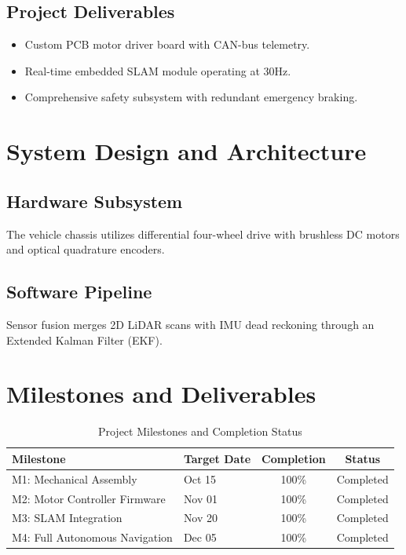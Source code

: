 \documentclass[12pt,a4paper]{report}
\begin{document}
\section{Project Deliverables}
\begin{itemize}
    \item Custom PCB motor driver board with CAN-bus telemetry.
    \item Real-time embedded SLAM module operating at 30Hz.
    \item Comprehensive safety subsystem with redundant emergency braking.
\end{itemize}

\chapter{System Design and Architecture}
\section{Hardware Subsystem}
The vehicle chassis utilizes differential four-wheel drive with brushless DC motors and optical quadrature encoders.

\section{Software Pipeline}
Sensor fusion merges 2D LiDAR scans with IMU dead reckoning through an Extended Kalman Filter (EKF).

\chapter{Milestones and Deliverables}
\begin{table}[htbp]
\centering
\caption{Project Milestones and Completion Status}
\label{tab:milestones}
\begin{tabular}{llcc}
\toprule
\textbf{Milestone} & \textbf{Target Date} & \textbf{Completion} & \textbf{Status} \\
\midrule
M1: Mechanical Assembly & Oct 15 & 100\% & Completed \\
M2: Motor Controller Firmware & Nov 01 & 100\% & Completed \\
M3: SLAM Integration & Nov 20 & 100\% & Completed \\
M4: Full Autonomous Navigation & Dec 05 & 100\% & Completed \\
\bottomrule
\end{tabular}
\end{table}
\end{document}
